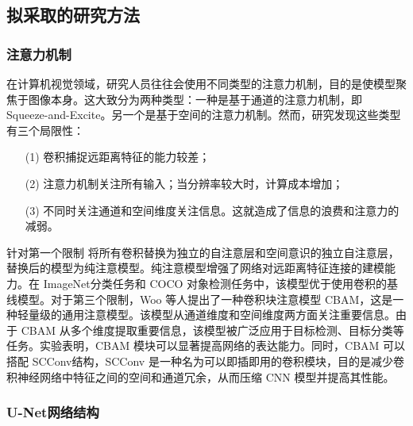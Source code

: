 \documentclass[a4paper]{ctexart}
\begin{document}
	\subsection{拟采取的研究方法}
	
	\subsubsection{注意力机制}
	
	在计算机视觉领域，研究人员往往会使用不同类型的注意力机制，目的是使模型聚焦于图像本身。这大致分为两种类型：一种是基于通道的注意力机制，即 Squeeze-and-Excite。另一个是基于空间的注意力机制\cite{woo2018cbam}。然而，研究发现这些类型有三个局限性：
	
	\begin{itemize}
		\item[(1)] 
		卷积捕捉远距离特征的能力较差；
		
		\item[(2)]
		注意力机制关注所有输入；当分辨率较大时，计算成本增加；
		
		\item[(3)]
		不同时关注通道和空间维度关注信息。这就造成了信息的浪费和注意力的减弱。
	\end{itemize}	
	
	针对第一个限制 \cite{ramachandran2019stand} 将所有卷积替换为独立的自注意层和空间意识的独立自注意层，替换后的模型为纯注意模型。纯注意模型增强了网络对远距离特征连接的建模能力。在 ImageNet分类任务和 COCO 对象检测任务中，该模型优于使用卷积的基线模型。对于第三个限制，Woo 等人\cite{woo2018cbam}提出了一种卷积块注意模型 CBAM，这是一种轻量级的通用注意模型。该模型从通道维度和空间维度两方面关注重要信息。由于 CBAM 从多个维度提取重要信息，该模型被广泛应用于目标检测、目标分类等任务。实验表明，CBAM 模块可以显著提高网络的表达能力。同时，CBAM 可以搭配 SCConv\cite{li2023scconv}结构，SCConv 是一种名为可以即插即用的卷积模块，目的是减少卷积神经网络中特征之间的空间和通道冗余，从而压缩 CNN 模型并提高其性能。
	
	\subsubsection{U-Net网络结构}
	
\end{document}
